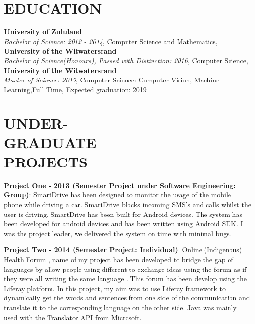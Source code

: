 \documentclass[margin]{res}
\begin{document}
\begin{resume}

\section{EDUCATION}
\textbf{University of Zululand}\\
{\sl Bachelor of Science: 2012 - 2014}, Computer Science and Mathematics, 
\\
\textbf{University of the Witwatersrand}\\
{\sl Bachelor of Science(Honours), Passed with Distinction: 2016}, Computer Science,
\\
\textbf{University of the Witwatersrand}\\
{\sl Master of Science: 2017}, Computer Science: Computer Vision, Machine Learning,Full Time, Expected graduation: 2019

\section{UNDER-\\GRADUATE\\PROJECTS}
\par
\textbf{Project One - 2013 (Semester Project under Software Engineering: Group)}: 
SmartDrive has been designed to monitor the usage of the mobile phone while 
driving a car. SmartDrive blocks incoming SMS’s and calls whilst the user is
driving. SmartDrive has been built for Android devices. The system has been developed for android devices and has been written using Android SDK.
I was the project leader, we delivered the system on time with minimal bugs. 

\par
\textbf{Project Two - 2014 (Semester Project: Individual)}:
Online (Indigenous) Health Forum , name of my project has been developed to 
bridge the gap of languages by allow people using different to exchange ideas 
using the forum as if they were all writing the same language .  This forum has 
been develop using the Liferay platform. In this project, my aim was to use Liferay framework to dynamically get the words and sentences from one side of the communication and translate it to the corresponding language on the other side. Java was mainly used with the Translator API from Microsoft.
\par


\end{resume}
\end{document}
